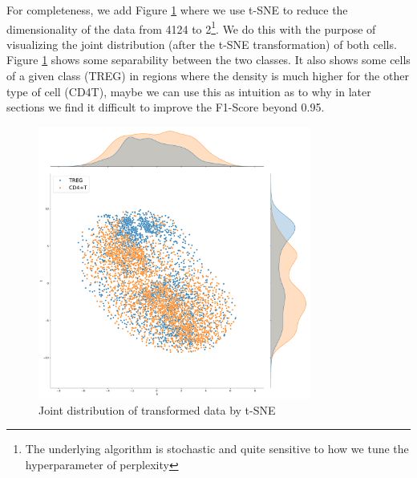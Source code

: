\documentclass{article}
\begin{document}

For completeness, we add Figure \ref{fig:tsne} where we use t-SNE to reduce the dimensionality of the data from 4124 to 2\footnote{ The underlying algorithm is stochastic 
and quite sensitive to how we tune the hyperparameter of perplexity}. We do this with the purpose of visualizing the joint distribution (after the t-SNE transformation) of both cells. 
Figure \ref{fig:tsne} shows some separability between the two classes. It also shows some cells of a given class (TREG) in regions where the density is much higher for the other type of cell (CD4T), maybe we can use this as intuition as to why
in later sections we find it difficult to improve the F1-Score beyond 0.95.


\begin{figure}[h]
    \centering
    \includegraphics[width=0.8\textwidth]{t11_joint_tsne.pdf}
    \caption{Joint distribution of transformed data by t-SNE}\label{fig:tsne}
\end{figure}
\end{document}
